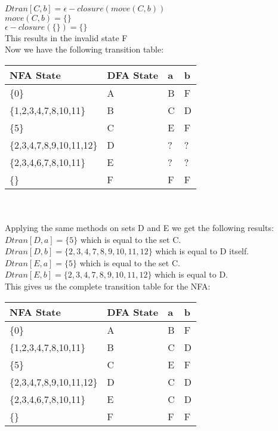 \documentclass[11pt, a4paper]{article}
\begin{document}
		$Dtran[C,b] = \epsilon -closure(move(C,b))$~\\
		$move(C,b) = \{\}$\\
		$\epsilon -closure(\{\}) = \{\}$\\ 
		This results in the invalid state F \\
		Now we have the following transition table: \\
		\begin{tabular}{|l|l||l|l|}
			\hline
			NFA State & DFA State & a & b \\
			\hline
			\{0\} & A & B & F \\
			\hline
			\{1,2,3,4,7,8,10,11\} & B & C & D\\
			\hline
			\{5\} & C & E & F \\
			\hline
			\{2,3,4,7,8,9,10,11,12\} & D & ? & ? \\
			\hline
			\{2,3,4,6,7,8,10,11\} & E & ? & ? \\
			\hline
			\{\} & F & F & F \\
			\hline
		\end{tabular}~\\~\\
		Applying the same methods on sets D and E we get the following results:\\
		$Dtran[D,a] = \{5\}$ which is equal to the set C. \\
		$Dtran[D,b] = \{2,3,4,7,8,9,10,11,12\}$ which is equal to D itself. \\
		$Dtran[E,a] = \{5\}$ which is equal to the set C. \\
		$Dtran[E,b] = \{2,3,4,7,8,9,10,11,12\}$ which is equal to D. \\
		This gives us the complete transition table for the NFA: \\
		\begin{tabular}{|l|l||l|l|}
			\hline
			NFA State & DFA State & a & b \\
			\hline
			\{0\} & A & B & F \\
			\hline
			\{1,2,3,4,7,8,10,11\} & B & C & D\\
			\hline
			\{5\} & C & E & F \\
			\hline
			\{2,3,4,7,8,9,10,11,12\} & D & C & D \\
			\hline
			\{2,3,4,6,7,8,10,11\} & E & C & D \\
			\hline
			\{\} & F & F & F \\
			\hline
		\end{tabular}~\\~\\
\end{document}
